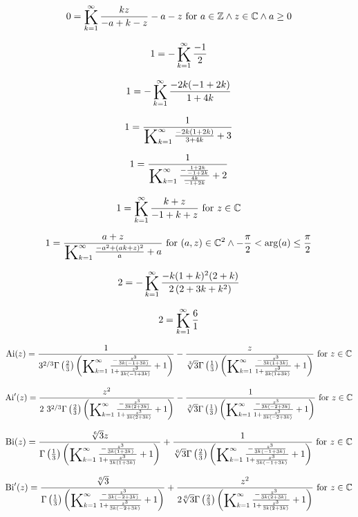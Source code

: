 \documentclass{article}
\newcommand{\bigK}{\mathop{\raisebox{-5pt}{\huge K}}}
\begin{document}
\[0=\bigK_{k=1}^{\infty}\frac{k z}{-a+k-z}-a-z\text{ for }a\in \mathbb{Z}\land z\in \mathbb{C}\land a\geq 0\] 

\[1=-\bigK_{k=1}^{\infty}\frac{-1}{2}\] 

\[1=-\bigK_{k=1}^{\infty}\frac{-2 k (-1+2 k)}{1+4 k}\] 

\[1=\frac{1}{\bigK_{k=1}^{\infty}\frac{-2 k (1+2 k)}{3+4 k}+3}\] 

\[1=\frac{1}{\bigK_{k=1}^{\infty}\frac{-\frac{1+2 k}{-1+2 k}}{\frac{4 k}{-1+2 k}}+2}\] 

\[1=\bigK_{k=1}^{\infty}\frac{k+z}{-1+k+z}\text{ for }z\in \mathbb{C}\] 

\[1=\frac{a+z}{\bigK_{k=1}^{\infty}\frac{-a^2+(a k+z)^2}{a}+a}\text{ for }(a,z)\in \mathbb{C}^2\land -\frac{\pi }{2}<\arg (a)\leq \frac{\pi }{2}\] 

\[2=-\bigK_{k=1}^{\infty}\frac{-k (1+k)^2 (2+k)}{2 \left(2+3 k+k^2\right)}\] 

\[2=\bigK_{k=1}^{\infty}\frac{6}{1}\] 

\[\text{Ai}(z)=\frac{1}{3^{2/3} \Gamma \left(\frac{2}{3}\right) \left(\bigK_{k=1}^{\infty}\frac{-\frac{z^3}{3 k (-1+3 k)}}{1+\frac{z^3}{3 k (-1+3 k)}}+1\right)}-\frac{z}{\sqrt[3]{3} \Gamma \left(\frac{1}{3}\right) \left(\bigK_{k=1}^{\infty}\frac{-\frac{z^3}{3 k (1+3 k)}}{1+\frac{z^3}{3 k (1+3 k)}}+1\right)}\text{ for }z\in \mathbb{C}\] 

\[\text{Ai}'(z)=\frac{z^2}{2\ 3^{2/3} \Gamma \left(\frac{2}{3}\right) \left(\bigK_{k=1}^{\infty}\frac{-\frac{z^3}{3 k (2+3 k)}}{1+\frac{z^3}{3 k (2+3 k)}}+1\right)}-\frac{1}{\sqrt[3]{3} \Gamma \left(\frac{1}{3}\right) \left(\bigK_{k=1}^{\infty}\frac{-\frac{z^3}{3 k (-2+3 k)}}{1+\frac{z^3}{3 k (-2+3 k)}}+1\right)}\text{ for }z\in \mathbb{C}\] 

\[\text{Bi}(z)=\frac{\sqrt[6]{3} z}{\Gamma \left(\frac{1}{3}\right) \left(\bigK_{k=1}^{\infty}\frac{-\frac{z^3}{3 k (1+3 k)}}{1+\frac{z^3}{3 k (1+3 k)}}+1\right)}+\frac{1}{\sqrt[6]{3} \Gamma \left(\frac{2}{3}\right) \left(\bigK_{k=1}^{\infty}\frac{-\frac{z^3}{3 k (-1+3 k)}}{1+\frac{z^3}{3 k (-1+3 k)}}+1\right)}\text{ for }z\in \mathbb{C}\] 

\[\text{Bi}'(z)=\frac{\sqrt[6]{3}}{\Gamma \left(\frac{1}{3}\right) \left(\bigK_{k=1}^{\infty}\frac{-\frac{z^3}{3 k (-2+3 k)}}{1+\frac{z^3}{3 k (-2+3 k)}}+1\right)}+\frac{z^2}{2 \sqrt[6]{3} \Gamma \left(\frac{2}{3}\right) \left(\bigK_{k=1}^{\infty}\frac{-\frac{z^3}{3 k (2+3 k)}}{1+\frac{z^3}{3 k (2+3 k)}}+1\right)}\text{ for }z\in \mathbb{C}\] 
\end{document}
